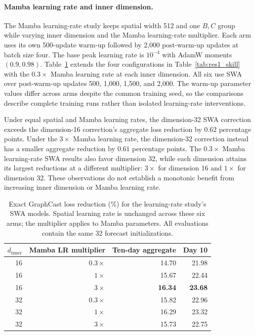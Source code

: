\documentclass{article}
\begin{document}
\paragraph{Mamba learning rate and inner dimension.}
The Mamba learning-rate study keeps spatial width 512 and one $B,C$ group while varying inner dimension and the Mamba learning-rate multiplier. Each arm uses its own 500-update warm-up followed by 2,000 post-warm-up updates at batch size four. The base peak learning rate is $10^{-4}$ with AdamW moments $(0.9,0.98)$. Table~\ref{tab:lr_sensitivity} extends the four configurations in Table~\ref{tab:res1_skill} with the $0.3\times$ Mamba learning rate at each inner dimension. All six use SWA over post-warm-up updates 500, 1,000, 1,500, and 2,000. The warm-up parameter values differ across arms despite the common training seed, so the comparisons describe complete training runs rather than isolated learning-rate interventions.

Under equal spatial and Mamba learning rates, the dimension-32 SWA correction exceeds the dimension-16 correction's aggregate loss reduction by $0.62$ percentage points. Under the $3\times$ Mamba learning rate, the dimension-32 correction instead has a smaller aggregate reduction by $0.61$ percentage points. The $0.3\times$ Mamba learning-rate SWA results also favor dimension 32, while each dimension attains its largest reductions at a different multiplier: $3\times$ for dimension 16 and $1\times$ for dimension 32. These observations do not establish a monotonic benefit from increasing inner dimension or Mamba learning rate.

\begin{table}[htbp]
    \centering
    \caption{Exact GraphCast loss reduction (\%) for the learning-rate study's SWA models. Spatial learning rate is unchanged across these six arms; the multiplier applies to Mamba parameters. All evaluations contain the same 32 forecast initializations.}
    \label{tab:lr_sensitivity}
    \small
    \begin{tabular}{rrrr}
        \toprule
        $d_{\mathrm{inner}}$ & Mamba LR multiplier & Ten-day aggregate & Day 10 \\
        \midrule
        16 & $0.3\times$ & 14.70 & 21.98 \\
        16 & $1\times$   & 15.67 & 22.44 \\
        16 & $3\times$   & \textbf{16.34} & \textbf{23.68} \\
        32 & $0.3\times$ & 15.82 & 22.96 \\
        32 & $1\times$   & 16.29 & 23.32 \\
        32 & $3\times$   & 15.73 & 22.75 \\
        \bottomrule
    \end{tabular}
\end{table}
\end{document}
